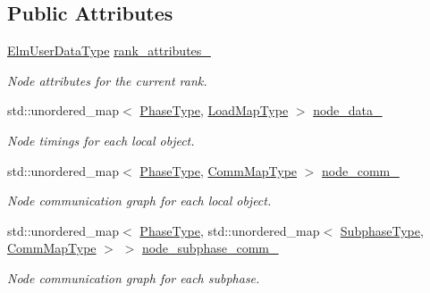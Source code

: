 \subsection*{Public Attributes}
\begin{DoxyCompactItemize}
\item 
\hyperlink{namespacevt_1_1vrt_1_1collection_1_1balance_abf9eea0f4c24e41036ab844025e7d4c8}{Elm\+User\+Data\+Type} \hyperlink{structvt_1_1vrt_1_1collection_1_1balance_1_1_l_b_data_holder_a09eb4cd8fb13f5e64250a538646daf77}{rank\+\_\+attributes\+\_\+}
\begin{DoxyCompactList}\small\item\em Node attributes for the current rank. \end{DoxyCompactList}\item 
std\+::unordered\+\_\+map$<$ \hyperlink{namespacevt_a46ce6733d5cdbd735d561b7b4029f6d7}{Phase\+Type}, \hyperlink{namespacevt_1_1vrt_1_1collection_1_1balance_a5339303db2e1ce964d783a53fd74e6b1}{Load\+Map\+Type} $>$ \hyperlink{structvt_1_1vrt_1_1collection_1_1balance_1_1_l_b_data_holder_a946b456d5de23d9a00e91c1dcc12699f}{node\+\_\+data\+\_\+}
\begin{DoxyCompactList}\small\item\em Node timings for each local object. \end{DoxyCompactList}\item 
std\+::unordered\+\_\+map$<$ \hyperlink{namespacevt_a46ce6733d5cdbd735d561b7b4029f6d7}{Phase\+Type}, \hyperlink{namespacevt_1_1vrt_1_1collection_1_1balance_a01ee1fb0ae2da1d2ab7fdca3be9ae351}{Comm\+Map\+Type} $>$ \hyperlink{structvt_1_1vrt_1_1collection_1_1balance_1_1_l_b_data_holder_a627c83ae5c9add8cfb626a42d6031612}{node\+\_\+comm\+\_\+}
\begin{DoxyCompactList}\small\item\em Node communication graph for each local object. \end{DoxyCompactList}\item 
std\+::unordered\+\_\+map$<$ \hyperlink{namespacevt_a46ce6733d5cdbd735d561b7b4029f6d7}{Phase\+Type}, std\+::unordered\+\_\+map$<$ \hyperlink{namespacevt_ae78cbfdf1e57470e33eedb074f2beeba}{Subphase\+Type}, \hyperlink{namespacevt_1_1vrt_1_1collection_1_1balance_a01ee1fb0ae2da1d2ab7fdca3be9ae351}{Comm\+Map\+Type} $>$ $>$ \hyperlink{structvt_1_1vrt_1_1collection_1_1balance_1_1_l_b_data_holder_a733c6d7b9fb2bb0c67588eed9b9cd5fc}{node\+\_\+subphase\+\_\+comm\+\_\+}
\begin{DoxyCompactList}\small\item\em Node communication graph for each subphase. \end{DoxyCompactList}\item 

\end{DoxyCompactItemize}
